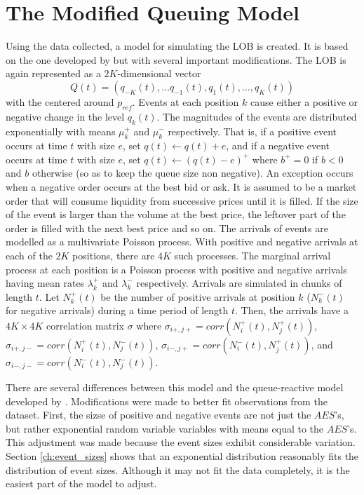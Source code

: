 \section{The Modified Queuing Model}\label{ch:queue_model}
Using the data collected, a model for simulating the LOB is created. It is based on the one developed by \cite{A6} but with several important modifications. The LOB is again represented as a $2K$-dimensional vector $$Q(t) = (q_{-K}(t), \ldots q_{-1}(t), q_1(t), \ldots , q_K(t))$$ with the centered around $p_{ref}$. Events at each position $k$ cause either a positive or negative change in the level $q_k(t)$. The magnitudes of the events are distributed exponentially with means $\mu^+_k$ and $\mu^-_k$ respectively. That is, if a positive event occurs at time $t$ with size $e$, set $q(t) \leftarrow q(t) + e$, and if a negative event occurs at time $t$ with size $e$, set $q(t) \leftarrow (q(t) - e)^+$ where $b^+ = 0$ if $b < 0$ and $b$ otherwise (so as to keep the queue size non negative). An exception occurs when a negative order occurs at the best bid or ask. It is assumed to be a market order that will consume liquidity from successive prices until it is filled. If the size of the event is larger than the volume at the best price, the leftover part of the order is filled with the next best price and so on. The arrivals of events are modelled as a multivariate Poisson process. With positive and negative arrivals at each of the $2K$ positions, there are $4K$ such processes. The marginal arrival process at each position is a Poisson process with positive and negative arrivals having mean rates $\lambda^+_k$ and $\lambda^-_k$ respectively. Arrivals are simulated in chunks of length $t$. Let $N^+_k(t)$ be the number of positive arrivals at position $k$ ($N^-_k(t)$ for negative arrivals) during a time period of length $t$. Then, the arrivals have a $4K\times4K$ correlation matrix $\sigma$ where $\sigma_{i+,j+} = corr(N^+_i(t), N^+_j(t))$, $\sigma_{i+,j-} = corr(N^+_i(t), N^-_j(t))$, $\sigma_{i-,j+} = corr(N^-_i(t), N^+_j(t))$, and $\sigma_{i-,j-} = corr(N^-_i(t), N^-_j(t))$.

There are several differences between this model and the queue-reactive model developed by \cite{A6}. Modifications were made to better fit observations from the dataset. First, the sizse of positive and negative events are not just the $AES$'s, but rather exponential random variable variables with means equal to the $AES$'s. This adjustment was made because the event sizes exhibit considerable variation. Section \ref{ch:event_sizes} shows that an exponential distribution reasonably fits the distribution of event sizes. Although it may not fit the data completely, it is the easiest part of the model to adjust.

